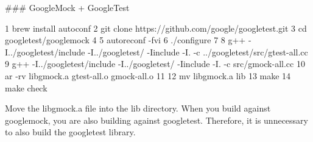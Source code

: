 \#\#\# Google\+Mock + Google\+Test 
\begin{DoxyCode}
1 brew install autoconf
2 git clone https://github.com/google/googletest.git
3 cd googletest/googlemock
4 
5 autoreconf -fvi
6 ./configure
7 
8 g++ -I../googletest/include -I../googletest/ -Iinclude -I. -c ../googletest/src/gtest-all.cc 
9 g++ -I../googletest/include -I../googletest/ -Iinclude -I. -c src/gmock-all.cc 
10 ar -rv libgmock.a gtest-all.o gmock-all.o
11 
12 mv libgmock.a lib
13 make
14 make check
\end{DoxyCode}


Move the libgmock.\+a file into the lib directory. When you build against googlemock, you are also building against googletest. Therefore, it is unnecessary to also build the googletest library. 